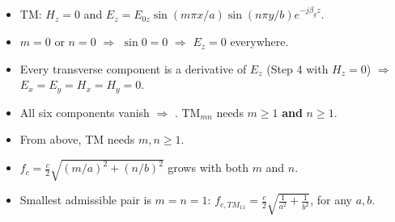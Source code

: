 \par{}
{\color{sub}\footnotesize {}}
\begin{itemize}
  \item TM: $H_z = 0$ and $E_z = E_{0z}\sin(m\pi x/a)\sin(n\pi y/b)e^{-j\beta_g z}$.
  \item $m = 0$ or $n = 0$ $\Rightarrow$ $\sin 0 = 0$ $\Rightarrow$ $E_z = 0$ everywhere.
  \item Every transverse component is a derivative of $E_z$ (Step 4 with $H_z = 0$)
    $\Rightarrow$ $E_x = E_y = H_x = H_y = 0$.
  \item All six components vanish $\Rightarrow$ . TM$_{mn}$ needs
    $m \ge 1$ \textbf{and} $n \ge 1$.
\end{itemize}

\par{}
{\color{sub}\footnotesize {}}
\begin{itemize}
  \item From above, TM needs $m, n \ge 1$.
  \item $f_c = \frac{c}{2}\sqrt{(m/a)^2 + (n/b)^2}$ grows with both $m$ and $n$.
  \item Smallest admissible pair is $m = n = 1$:
    $\boxed{f_{c,TM_{11}} = \frac{c}{2}\sqrt{\frac{1}{a^2} + \frac{1}{b^2}}}$, for any $a, b$.
\end{itemize}

